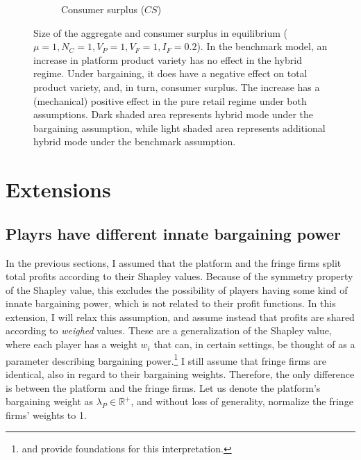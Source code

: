 \documentclass[a4paper]{article}
\begin{document}
\begin{figure}
\begin{subfigure}[b]{0.45\textwidth}
        \caption{Consumer surplus ($CS$)}
        \label{fig:welfare_consumer_surplus}
    \end{subfigure}
    \caption{Size of the aggregate and consumer surplus in equilibrium ($\mu = 1, N_C = 1, V_P = 1, V_F = 1, I_F = 0.2$). In the benchmark model, an increase in platform product variety has no effect in the hybrid regime. Under bargaining, it does have a negative effect on total product variety, and, in turn, consumer surplus. The increase has a (mechanical) positive effect in the pure retail regime under both assumptions. Dark shaded area represents hybrid mode under the bargaining assumption, while light shaded area represents additional hybrid mode under the benchmark assumption.}
    \label{fig:welfare}
\end{figure}


\section{Extensions}
\label{sec:extensions}

\subsection{Playrs have different innate bargaining power}
\label{sec:lower_bargaining_power}

In the previous sections, I assumed that the platform and the fringe firms split total profits according to their Shapley values.
Because of the symmetry property of the Shapley value, this excludes the possibility of players having some kind of innate bargaining power, which is not related to their profit functions.
In this extension, I will relax this assumption, and assume instead that profits are shared according to \emph{weighed} values.
These are a generalization of the Shapley value, where each player has a weight $w_i$ that can, in certain settings, be thought of as a parameter describing bargaining power.\footnote{
    \textcite{hart1996bargaining} and \textcite{stole1996intra} provide foundations for this interpretation.
}
I still assume that fringe firms are identical, also in regard to their bargaining weights.
Therefore, the only difference is between the platform and the fringe firms.
Let us denote the platform's bargaining weight as $\lambda_P \in \mathbb{R}^+$, and without loss of generality, normalize the fringe firms' weights to 1.
\end{document}
